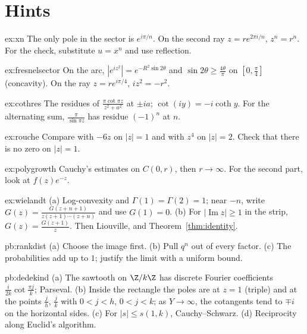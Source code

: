 \section{Hints}

\begin{hint}{ex:xn}
The only pole in the sector is $e^{i\pi/n}$. On the second ray $z=re^{2\pi i/n}$, $z^n=r^n$. For the check, substitute $u=x^n$ and use reflection.
\end{hint}
\begin{hint}{ex:fresnelsector}
On the arc, $|e^{iz^2}|=e^{-R^2\sin2\theta}$ and $\sin2\theta\ge\frac{4\theta}\pi$ on $[0,\frac\pi4]$ (concavity). On the ray $z=re^{i\pi/4}$, $iz^2=-r^2$.
\end{hint}
\begin{hint}{ex:cothres}
The residues of $\frac{\pi\cot\pi z}{z^2+a^2}$ at $\pm ia$; $\cot(iy)=-i\coth y$. For the alternating sum, $\frac\pi{\sin\pi z}$ has residue $(-1)^n$ at $n$.
\end{hint}
\begin{hint}{ex:rouche}
Compare with $-6z$ on $|z|=1$ and with $z^4$ on $|z|=2$. Check that there is no zero on $|z|=1$.
\end{hint}
\begin{hint}{ex:polygrowth}
Cauchy's estimates on $C(0,r)$, then $r\to\infty$. For the second part, look at $f(z)e^{-z}$.
\end{hint}
\begin{hint}{ex:wielandt}
(a) Log-convexity and $\Gamma(1)=\Gamma(2)=1$; near $-n$, write $G(z)=\frac{G(z+n+1)}{z(z+1)\cdots(z+n)}$ and use $G(1)=0$. (b) For $|\operatorname{Im}z|\ge1$ in the strip, $G(z)=\frac{G(z+1)}z$.
Then Liouville, and Theorem~\ref{thm:identity}.
\end{hint}

\begin{hint}{pb:rankdist}
(a) Choose the image first. (b) Pull $q^{n}$ out of every factor. (c) The probabilities add up to $1$; justify the limit with a
uniform bound.
\end{hint}

\begin{hint}{pb:dedekind}
(a) The sawtooth on $\Z/k\Z$ has discrete Fourier coefficients $\frac i{2k}\cot\frac{\pi j}k$; Parseval. (b) Inside the rectangle the poles are at $z=1$ (triple) and at the
points $\frac jh$, $\frac jk$ with $0<j<h$, $0<j<k$; as $Y\to\infty$, the cotangents tend to $\mp i$ on the horizontal sides. (c) For $|s|\le s(1,k)$, Cauchy--Schwarz. (d) Reciprocity
along Euclid's algorithm.
\end{hint}

